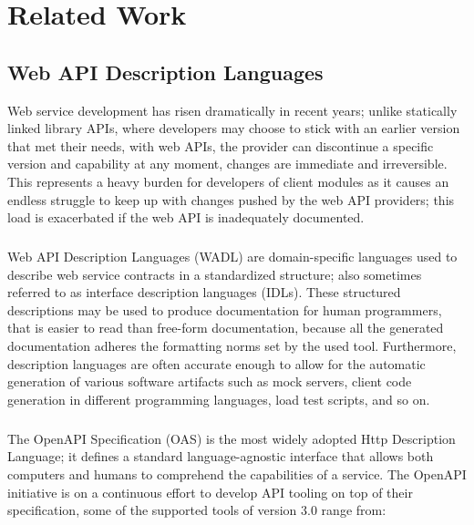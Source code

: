 
%

\chapter{Related Work}
\label{cha:related_work}

\section{Web API Description Languages} %
\label{sec:web_api_description_languages}

Web service development has risen dramatically in recent years;  unlike statically linked library APIs,
where developers may choose to stick with an earlier version that met their needs, with web APIs,
the provider can discontinue a specific version and capability at any moment, changes are immediate and irreversible.
This represents a heavy burden for developers of client modules as it causes an endless struggle to keep up
with changes pushed by the web API providers; this load is exacerbated if the web API is inadequately documented.
\paragraph{}
Web API Description Languages (WADL) are domain-specific languages used to describe web service contracts in a standardized structure;
also sometimes referred to as interface description languages (IDLs).
These structured descriptions may be used to produce documentation for human programmers, that is easier to read than free-form documentation,
because all the generated documentation adheres the formatting norms set by the used tool.
Furthermore, description languages are often accurate enough to allow for the automatic generation of various software artifacts such as mock servers,
client code generation in different programming languages, load test scripts, and so on.

\paragraph{}

The OpenAPI Specification (OAS) \cite{openAPI} is the most widely adopted Http Description Language;
it defines a standard language-agnostic interface that allows both computers and humans to comprehend the capabilities of a service.
The OpenAPI initiative is on a continuous effort to develop API tooling on top of their specification, some of the supported tools of version 3.0 range from:

